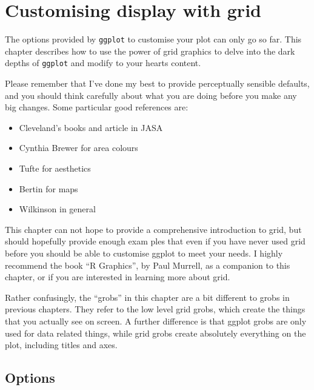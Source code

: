 


\chapter{Customising display with grid}

The options provided by {\tt ggplot} to customise your plot can only go so far.  This chapter describes how to use the power of grid graphics to delve into the dark depths of {\tt ggplot} and modify to your hearts content.  

Please remember that I've done my best to provide perceptually sensible defaults, and you should think carefully about what you are doing before you make any big changes.  Some particular good references are:

\begin{itemize}
	\item Cleveland's books and article in JASA
	\item Cynthia Brewer for area colours
	\item Tufte for aesthetics
	\item Bertin for maps
	\item Wilkinson in general
\end{itemize}

This chapter can not hope to provide a comprehensive introduction to grid, but should hopefully provide enough exam	ples that even if you have never used grid before you should be able to customise ggplot to meet your needs.  I highly recommend the book ``R Graphics'', by Paul Murrell, as a companion to this chapter, or if you are interested in learning more about grid.   

Rather confusingly, the ``grobs'' in this chapter are a bit different to grobs in previous chapters.  They refer to the low level grid grobs, which create the things that you actually see on screen.  A further difference is that ggplot grobs are only used for data related things, while grid grobs create absolutely everything on the plot, including titles and axes.


\section{Options}\label{sec:options}

